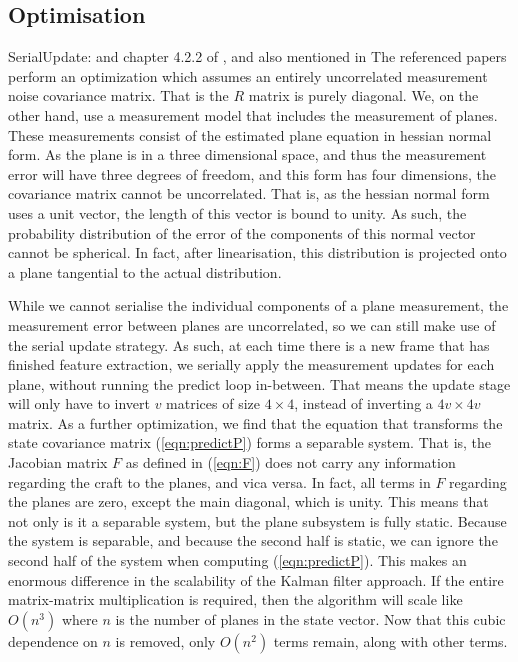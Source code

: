 \documentclass[]{article}
\begin{document}
{%

\subsection{Optimisation} %
\label{sub:optimisation}

SerialUpdate: \cite{OpenPilotPaper} and chapter 4.2.2 of \cite{KFBookSerialupdate}, and also mentioned in \cite{Sola2013}
The referenced papers perform an optimization which assumes an entirely uncorrelated measurement noise covariance matrix. That is the $R$ matrix is purely diagonal.
We, on the other hand, use a measurement model that includes the measurement of planes. These measurements consist of the estimated plane equation in hessian normal form. As the plane is in a three dimensional space, and thus the measurement error will have three degrees of freedom, and this form has four dimensions, the covariance matrix cannot be uncorrelated.
That is, as the hessian normal form uses a unit vector, the length of this vector is bound to unity. As such, the probability distribution of the error of the components of this normal vector cannot be spherical.
In fact, after linearisation, this distribution is projected onto a plane tangential to the actual distribution. 

While we cannot serialise the individual components of a plane measurement, the measurement error between planes are uncorrelated, so we can still make use of the serial update strategy. As such, at each time there is a new frame that has finished feature extraction, we serially apply the measurement updates for each plane, without running the predict loop in-between.
That means the update stage will only have to invert $v$ matrices of size $4\times4$, instead of inverting a $4v \times 4v$ matrix. 
As a further optimization, we find that the equation that transforms the state covariance matrix (\ref{eqn:predictP}) forms a separable system. That is, the Jacobian matrix $F$ as defined in (\ref{eqn:F}) does not carry any information regarding the craft to the planes, and vica versa.
In fact, all terms in $F$ regarding the planes are zero, except the main diagonal, which is unity. This means that not only is it a separable system, but the plane subsystem is fully static.
Because the system is separable, and because the second half is static, we can ignore the second half of the system when computing (\ref{eqn:predictP}).
This makes an enormous difference in the scalability of the Kalman filter approach. If the entire matrix-matrix multiplication is required, then the algorithm will scale like $O(n^3)$ where $n$ is the number of planes in the state vector. Now that this cubic dependence on $n$ is removed, only $O(n^2)$ terms remain, along with other terms.

}
\end{document}
